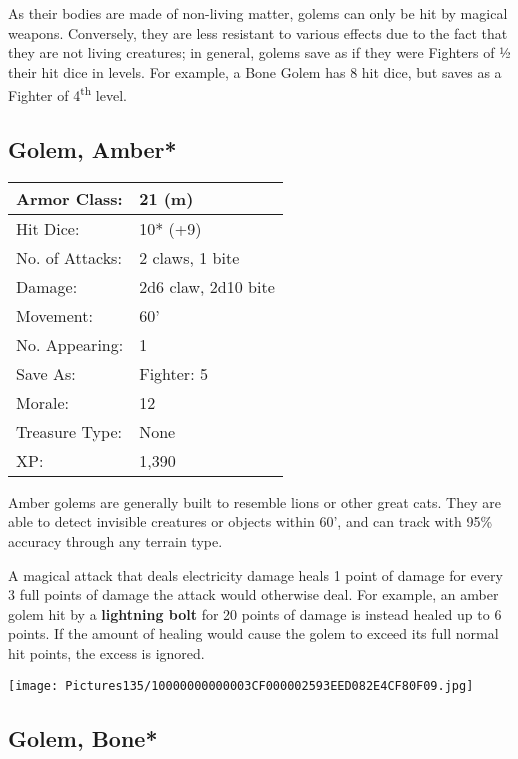 \documentclass[a4paper,twoside,openany,10pt]{book}
\begin{document}
\begin{multicols}{2}
As their bodies are made of non-living matter, golems can only be hit by magical weapons. Conversely, they are less resistant to various effects due to the fact that they are not living creatures; in general, golems save as if they were Fighters of ½ their hit dice in levels. For example, a Bone Golem has 8 hit dice, but saves as a Fighter of 4\textsuperscript{th} level.

\subsection*{Golem, Amber*}\label{golem-amber}

\begin{tabularx}{0.48\textwidth}{@{}lX@{}}
Armor Class: & 21 (m) \\\hline
Hit Dice: & 10* (+9) \\\hline
No. of Attacks: & 2 claws, 1 bite \\\hline
Damage: & 2d6 claw, 2d10 bite \\\hline
Movement: & 60' \\\hline
No. Appearing: & 1 \\\hline
Save As: & Fighter: 5 \\\hline
Morale: & 12 \\\hline
Treasure Type: & None \\\hline
XP: & 1,390 \\\hline
\end{tabularx}\medskip



Amber golems are generally built to resemble lions or other great cats. They are able to detect invisible creatures or objects within 60', and can track with 95\% accuracy through any terrain type.

A magical attack that deals electricity damage heals 1 point of damage for every 3 full points of damage the attack would otherwise deal. For example, an amber golem hit by a \textbf{lightning bolt} for 20 points of damage is instead healed up to 6 points. If the amount of healing would cause the golem to exceed its full normal hit points, the excess is ignored.


\begin{center}
	\texttt{[image: Pictures135/10000000000003CF000002593EED082E4CF80F09.jpg]}
\end{center}

\columnbreak


\subsection*{Golem, Bone*}\label{golem-bone}



\end{multicols}
\end{document}
